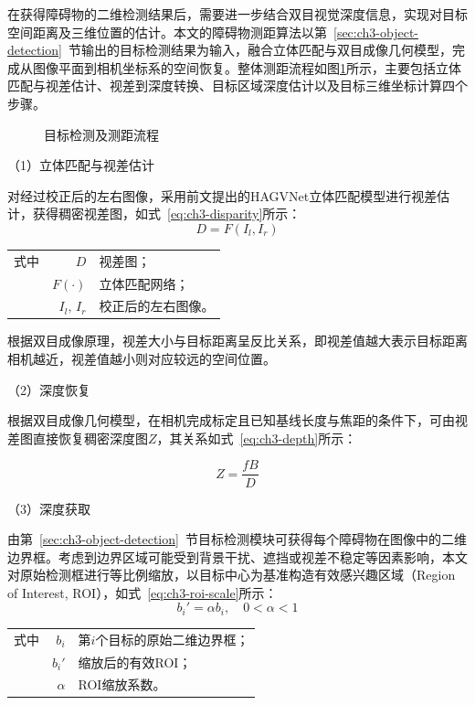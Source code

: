在获得障碍物的二维检测结果后，需要进一步结合双目视觉深度信息，实现对目标空间距离及三维位置的估计。本文的障碍物测距算法以第~\ref{sec:ch3-object-detection}~节输出的目标检测结果为输入，融合立体匹配与双目成像几何模型，完成从图像平面到相机坐标系的空间恢复。整体测距流程如图\ref{目标检测及测距流程}所示，主要包括立体匹配与视差估计、视差到深度转换、目标区域深度估计以及目标三维坐标计算四个步骤。

\begin{figure}[h]
  \centering
  
  \caption{目标检测及测距流程}
  \label{目标检测及测距流程}
\end{figure}

（1）立体匹配与视差估计

对经过校正后的左右图像，采用前文提出的HAGVNet立体匹配模型进行视差估计，获得稠密视差图，如式~\eqref{eq:ch3-disparity}所示：
\begin{equation}\label{eq:ch3-disparity}
D=F(I_l,I_r)
\end{equation}
\begin{tabularx}{\textwidth}{@{}l@{\quad}r@{———}X@{}}
式中& $D$ & 视差图；\\
& $F(\cdot)$ & 立体匹配网络；\\
& $I_l,\,I_r$ & 校正后的左右图像。\\
\end{tabularx}\vspace{3.15bp}

根据双目成像原理，视差大小与目标距离呈反比关系，即视差值越大表示目标距离相机越近，视差值越小则对应较远的空间位置。

（2）深度恢复

根据双目成像几何模型，在相机完成标定且已知基线长度与焦距的条件下，可由视差图直接恢复稠密深度图$Z$，其关系如式~\eqref{eq:ch3-depth}所示：

\begin{equation}\label{eq:ch3-depth}
Z=\frac{fB}{D}
\end{equation}

（3）深度获取

由第~\ref{sec:ch3-object-detection}~节目标检测模块可获得每个障碍物在图像中的二维边界框。考虑到边界区域可能受到背景干扰、遮挡或视差不稳定等因素影响，本文对原始检测框进行等比例缩放，以目标中心为基准构造有效感兴趣区域（Region of Interest, ROI），如式~\eqref{eq:ch3-roi-scale}所示：
\begin{equation}\label{eq:ch3-roi-scale}
b_i'=\alpha b_i,\quad 0<\alpha<1
\end{equation}
\begin{tabularx}{\textwidth}{@{}l@{\quad}r@{———}X@{}}
式中& $b_i$ & 第$i$个目标的原始二维边界框；\\
& $b_i'$ & 缩放后的有效ROI；\\
& $\alpha$ & ROI缩放系数。\\
\end{tabularx}\vspace{3.15bp}

